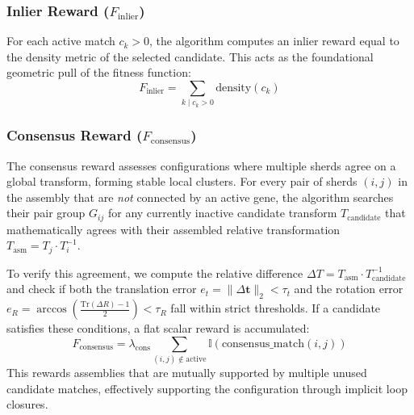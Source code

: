 \documentclass[conference]{IEEEtran}
\begin{document}
\subsubsection{Inlier Reward ($F_{\text{inlier}}$)}
For each active match $c_k > 0$, the algorithm computes an inlier reward equal to the density metric of the selected candidate. This acts as the foundational geometric pull of the fitness function:
\begin{equation}
F_{\text{inlier}} = \sum_{k \mid c_k > 0} \text{density}(c_k)
\end{equation}

\subsubsection{Consensus Reward ($F_{\text{consensus}}$)}
The consensus reward assesses configurations where multiple sherds agree on a global transform, forming stable local clusters. For every pair of sherds $(i, j)$ in the assembly that are \emph{not} connected by an active gene, the algorithm searches their pair group $G_{ij}$ for any currently inactive candidate transform $T_{\text{candidate}}$ that mathematically agrees with their assembled relative transformation $T_{\text{asm}} = T_j \cdot T_i^{-1}$.

To verify this agreement, we compute the relative difference $\Delta T = T_{\text{asm}} \cdot T_{\text{candidate}}^{-1}$ and check if both the translation error $e_t = \|\Delta \mathbf{t}\|_2 < \tau_t$ and the rotation error $e_R = \arccos\left(\frac{\text{Tr}(\Delta R) - 1}{2}\right) < \tau_R$ fall within strict thresholds. If a candidate satisfies these conditions, a flat scalar reward is accumulated:
\begin{equation}
F_{\text{consensus}} = \lambda_{\text{cons}} \sum_{(i,j) \notin \text{active}} \mathbb{I}(\text{consensus\_match}(i, j))
\end{equation}
This rewards assemblies that are mutually supported by multiple unused candidate matches, effectively supporting the configuration through implicit loop closures.
\end{document}
